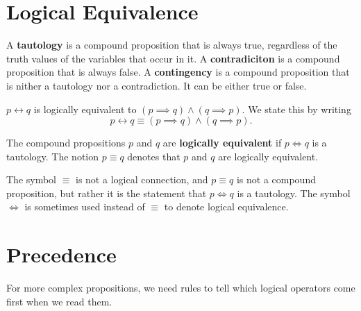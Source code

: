 \section{Logical Equivalence}
  A \textbf{tautology} is a compound proposition that is always true, regardless of the truth values of the variables that occur in it.
  A \textbf{contradiciton} is a compound proposition that is always false.
  A \textbf{contingency} is a compound proposition that is nither a tautology nor a contradiction.
  It can be either true or false.
\begin{ex}
  \( p \leftrightarrow q \) is logically equivalent to \( (p \implies q) \wedge (q \implies p)\).
  We state this by writing
  \[ p \leftrightarrow q \equiv (p \implies q) \wedge (q \implies p).\]
\end{ex}
\begin{table}  \centering
  \caption{The truth table for \((p \lor \neg q) \implies (p \land q)\)}
\end{table}
The compound propositions \(p\) and \(q\) are \textbf{logically equivalent} if \(p \iff q\) is a tautology.
The notion \(p \equiv q\) denotes that \(p\) and \(q\) are logically equivalent.
\begin{remark}
  The symbol \(\equiv\) is not a logical connection, and \(p\equiv q\) is not a compound proposition,
  but rather it is the statement that \(p \iff q\) is a tautology.
  The symbol \(\iff\) is sometimes used instead of \(\equiv\) to denote logical equivalence.
\end{remark}

\section{Precedence}
For more complex propositions, we need rules to tell which logical operators come first when we read them.

